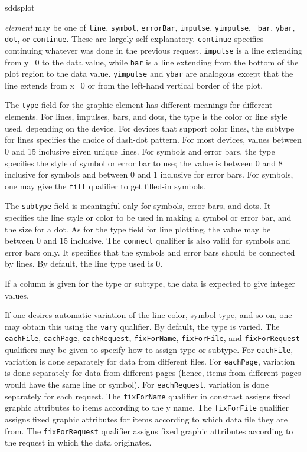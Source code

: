 \begin{sddsprog}{sddsplot}
\begin{itemize}
\begin{itemize}
{\em element} may be one of {\tt line}, {\tt symbol}, {\tt errorBar}, {\tt impulse}, {\tt yimpulse}, {\tt
bar}, {\tt ybar}, {\tt dot}, or {\tt continue}.  These are largely self-explanatory.  {\tt continue}
specifies continuing whatever was done in the previous request.  {\tt impulse} is a line extending from
y=0 to the data value, while {\tt bar} is a line extending from the bottom of the plot region to the data
value.  {\tt yimpulse} and {\tt ybar} are analogous except that the line extends from x=0 or from the
left-hand vertical border of the plot.

The {\tt type} field for the graphic element has different meanings for different elements.  For
lines, impulses, bars, and dots, the type is the color or line style used, depending on the device.
For devices that support color lines, the subtype for lines specifies the choice of dash-dot pattern.
For most devices, values between 0 and 15 inclusive given unique lines.  For symbols and error bars,
the type specifies the style of symbol or error bar to use; the value is between 0 and 8 inclusive
for symbols and between 0 and 1 inclusive for error bars.  For symbols, one may give the {\tt fill}
qualifier to get filled-in symbols.

The {\tt subtype} field is meaningful only for symbols, error bars, and dots.  It specifies the line style
or color to be used in making a symbol or error bar, and the size for a dot.  As for the type field for
line plotting, the value may be between 0 and 15 inclusive.  The {\tt connect} qualifier is also valid for
symbols and error bars only.  It specifies that the symbols and error bars should be connected by lines.
By default, the line type used is 0.

If a column is given for the type or subtype, the data is expected to give integer values.

If one desires automatic variation of the line color, symbol type, and
so on, one may obtain this using the \verb|vary| qualifier.  By
default, the type is varied.  The \verb|eachFile|, \verb|eachPage|,
\verb|eachRequest|, \verb|fixForName|, \verb|fixForFile|, and \verb|fixForRequest|
qualifiers may be given to specify how to
assign type or subtype.  For \verb|eachFile|, variation is done
separately for data from different files.  For \verb|eachPage|,
variation is done separately for data from different pages (hence,
items from different pages would have the same line or symbol).  For
\verb|eachRequest|, variation is done separately for each request.
The \verb|fixForName| qualifier in constrast assigns fixed graphic
attributes to items according to the y name.  The \verb|fixForFile|
qualifier assigns fixed graphic attributes for items according to which
data file they are from.  The \verb|fixForRequest| qualifier assigns fixed
graphic attributes according to the request in which the data originates.


\end{itemize}
\end{itemize}
\end{sddsprog}
